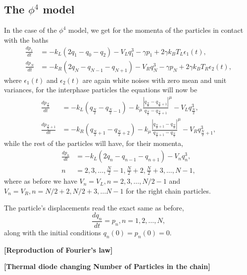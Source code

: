 \subsection{The $ \phi^{4} $ model}

In the case of the $ \phi^{4} $ model, we get for the momenta of the particles in contact with the baths
\begin{align*}
\frac{d p_{1} }{d t}&=
-k_{L}(2q_{1}-q_{0}-q_{2}) - V_{L}q_{1}^{3}
-\gamma p_{1} + 2\gamma k_{B}T_{L}\epsilon_{1}(t),\\
\frac{d p_{N} }{d t}&=
-k_{R}(2q_{N}-q_{N-1}-q_{N+1})-V_{R}q_{N}^{3}
-\gamma p_{N} + 2\gamma k_{B}T_{R} \epsilon_{2}(t),
\end{align*}
where $ \epsilon_{1}(t) $ and $ \epsilon_{2}(t) $ are again white noises with zero mean and unit variances, for the interphase particles the equations will now be
\begin{align*}
\frac{d p_{\frac{N}{2}}}{d t}&=
-k_{L}(q_{\frac{N}{2}}-q_{\frac{N}{2}-1}) 
-k_{\mu} \frac{\left|q_{\frac{N}{2}}-q_{\frac{N}{2}+1}\right|}
{q_{\frac{N}{2}}-q_{\frac{N}{2}+1}}^{\mu}
-V_{L}q_{\frac{N}{2}}^{3},\\
\frac{d p_{\frac{N}{2}+1} }{d t}&=
-k_{R}(q_{\frac{N}{2}+1}-q_{\frac{N}{2}+2}) 
-k_{\mu} \frac{\left|q_{\frac{N}{2}+1}-q_{\frac{N}{2}}\right|}
{q_{\frac{N}{2}+1}-q_{\frac{N}{2}}}^{\mu}
-V_{R}q_{\frac{N}{2}+1}^{3},
\end{align*} 
while the rest of the particles will have, for their momenta,
\begin{align*}
\frac{d p_{n} }{d t}&= 
-k_{L}(2q_{n}-q_{n-1}-q_{n+1})-V_{n}q_{n}^{3},\\
n&=2,3,\dots,\frac{N}{2}-1,\frac{N}{2}+2,\frac{N}{2}+3,\dots,N-1,
\end{align*}
where as before we have $ V_{n}=V_{L}, n=2,3,\dots,N/2-1 $ and $ V_{n}=V_{R}, n=N/2+2,N/2+3,\dots N-1 $ for the right chain particles.

The particle's displacements read the exact same as before,
\[ 
\frac{dq_{n} }{dt} = p_{n}, n=1,2,\dots,N,
\]
along with the initial conditions $ q_{n}(0)=p_{n}(0)=0 $.

\textbf{[Reproduction of Fourier's law]}

\textbf{[Thermal diode changing Number of Particles in the chain]}

